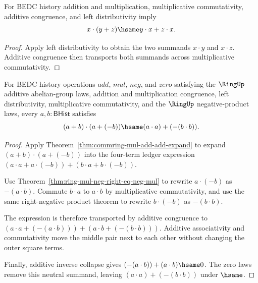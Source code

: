 \begin{theorem}
\label{thm:commring-left-distrib-commuted-terms}
For BEDC history addition and multiplication, multiplicative commutativity,
additive congruence, and left distributivity imply
$$
x\cdot(y+z)\hsame y\cdot x + z\cdot x .
$$
\end{theorem}
\begin{proof}
Apply left distributivity to obtain the two summands $x\cdot y$ and
$x\cdot z$. Additive congruence then transports both summands across
multiplicative commutativity.
\end{proof}

\begin{theorem}
\label{thm:commring-difference-of-squares}
For BEDC history operations $add$, $mul$, $neg$, and $zero$ satisfying the
$\RingUp$ additive abelian-group laws, addition and multiplication
congruence, left distributivity, multiplicative commutativity, and the
$\RingUp$ negative-product laws, every $a,b : \mathsf{BHist}$ satisfies
$$
(a+b)\cdot(a+(-b))\hsame (a\cdot a)+(-(b\cdot b)).
$$
\end{theorem}
\begin{proof}
Apply Theorem~\ref{thm:commring-mul-add-add-expand} to expand
$(a+b)\cdot(a+(-b))$ into the four-term ledger expression
$(a\cdot a+a\cdot(-b))+(b\cdot a+b\cdot(-b))$.

Use Theorem~\ref{thm:ring-mul-neg-right-eq-neg-mul} to rewrite
$a\cdot(-b)$ as $-(a\cdot b)$. Commute $b\cdot a$ to $a\cdot b$ by
multiplicative commutativity, and use the same right-negative product theorem
to rewrite $b\cdot(-b)$ as $-(b\cdot b)$.

The expression is therefore transported by additive congruence to
$(a\cdot a+(-(a\cdot b)))+(a\cdot b+(-(b\cdot b)))$. Additive associativity
and commutativity move the middle pair next to each other without changing the
outer square terms.

Finally, additive inverse collapse gives $(-(a\cdot b))+(a\cdot b)\hsame0$.
The zero laws remove this neutral summand, leaving
$(a\cdot a)+(-(b\cdot b))$ under $\hsame$.
\end{proof}

